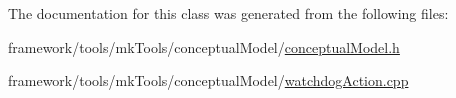 The documentation for this class was generated from the following files\+:\begin{DoxyCompactItemize}
\item 
framework/tools/mk\+Tools/conceptual\+Model/\hyperlink{conceptual_model_8h}{conceptual\+Model.\+h}\item 
framework/tools/mk\+Tools/conceptual\+Model/\hyperlink{watchdog_action_8cpp}{watchdog\+Action.\+cpp}\end{DoxyCompactItemize}
